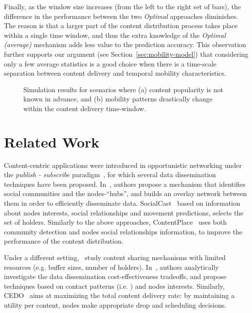 \documentclass[journal]{IEEEtran}
\newcommand{\revisionRed}[1]{{#1}}\newcommand{\red}[1]{{#1}}
\begin{document}
\revisionRed{
Finally, as the window size increases (from the left to the right set of bars), the difference in the performance between the two \textit{Optimal} approaches diminishes. The reason is that a larger part of the content distribution process takes place within a single time window, and thus the extra knowledge of the \textit{Optimal (average)} mechanism adds less value to the prediction accuracy. This observation further supports our argument (see Section~\ref{sec:mobility-model}) that considering only a few average statistics is a good choice when there is a time-scale separation between content delivery and temporal mobility characteristics.
}

\begin{figure}
\caption{\revisionRed{Simulation results for scenarios where (a) content popularity is not known in advance, and (b) mobility patterns drastically change within the content delivery time-window. }}
\label{fig:offloading-extensions}
\end{figure}







\section{Related Work}\label{sec:related-work}
Content-centric applications were introduced in opportunistic networking under the \textit{publish - subscribe} paradigm~\cite{Yoneki-publish-subscribe-dtn,podcasting,Costa-publish-subscribe-dtn,contentplace}, for which several data dissemination techniques have been proposed. In~\cite{Yoneki-publish-subscribe-dtn}, authors propose a mechanism that identifies social communities and the nodes-``hubs'', and builds an overlay network between them in order to efficiently disseminate data. SocialCast~\cite{Costa-publish-subscribe-dtn} based on information about nodes interests, social relationships and movement predictions, selects the set of holders. Similarly to the above approaches, ContentPlace~\cite{contentplace} uses both community detection and nodes social relationships information, to improve the performance of the content distribution. 

Under a different setting,~\cite{Gao-user-centric-DTN,CEDO} study content sharing mechanisms with limited resources (e.g. buffer sizes, number of holders). In~\cite{Gao-user-centric-DTN}, authors analytically investigate the data dissemination cost-effectiveness tradeoffs, and propose techniques based on contact patterns (i.e. ) and nodes interests. Similarly, CEDO~\cite{CEDO} aims at maximizing the total content delivery rate: by maintaining a utility per content, nodes make appropriate drop and scheduling decisions. 
\end{document}
